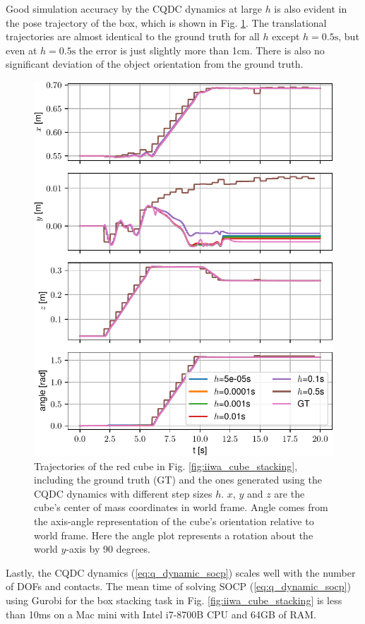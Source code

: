 Good simulation accuracy by the CQDC dynamics at large $h$ is also evident in the pose trajectory of the box, which is shown in Fig. \ref{fig:cube_pose}. The translational trajectories are almost identical to the ground truth for all $h$ except $h=0.5\mathrm{s}$, but even at $h=0.5\mathrm{s}$ the error is just slightly more than 1cm. There is also no significant deviation of the object orientation from the ground truth. 
\begin{figure}
\centering
\includegraphics[width=0.9\linewidth]{figures/02_quasi_static_dynamics/box0_pose.pdf}
\caption{Trajectories of the red cube in Fig. \ref{fig:iiwa_cube_stacking}, including the ground truth (GT) and the ones generated using the CQDC dynamics with different step sizes $h$. $x$, $y$ and $z$ are the cube's center of mass coordinates in world frame. Angle comes from the axis-angle representation of the cube's orientation relative to world frame. Here the angle plot represents a rotation about the world $y$-axis by 90 degrees.}
\label{fig:cube_pose}
\end{figure}

Lastly, the CQDC dynamics (\ref{eq:q_dynamic_socp}) scales well with the number of DOFs and contacts. The mean time of solving SOCP (\ref{eq:q_dynamic_socp}) using Gurobi \cite{gurobi} for the box stacking task in Fig. \ref{fig:iiwa_cube_stacking} is less than 10ms on a Mac mini with Intel i7-8700B CPU and 64GB of RAM. 

